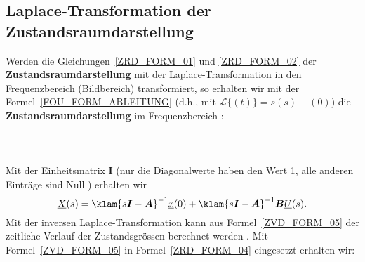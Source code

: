 \subsection{Laplace-Transformation der Zustandsraumdarstellung}
Werden die Gleichungen~\ref{ZRD_FORM_01} und \ref{ZRD_FORM_02} der
{\bf Zustandsraumdarstellung} mit der
Laplace-Transformation in den
Frequenzbereich (Bildbereich) transformiert, so erhalten wir mit der
Formel~\ref{FOU_FORM_ABLEITUNG} (d.h., mit
$\mathcal{L\{}$$(t)\}=s$$(s)-$$(0)$)
die {\bf Zustandsraumdarstellung} im Frequenzbereich \cite{GIR:RAB:STE:05}:\\~\\
\\~\\
Mit der Einheitsmatrix $\boldsymbol{I}$ (nur die Diagonalwerte haben den Wert 1, alle anderen Eintr\"age sind Null \cite{BRO:SEM:91}) erhalten wir\\
\begin{equation}
\underline{X}(s)=\klam{s\boldsymbol{I}-\boldsymbol{A}}^{-1}\underline{x}(0)+\klam{s\boldsymbol{I}-\boldsymbol{A}}^{-1}\boldsymbol{B}\underline{U}(s).\label{ZVD_FORM_05}
\end{equation}
Mit der inversen Laplace-Transformation kann aus Formel~\ref{ZVD_FORM_05} der zeitliche Verlauf der Zustandsgr\"ossen berechnet werden \cite{GIR:RAB:STE:05}. Mit Formel~\ref{ZVD_FORM_05} in Formel~\ref{ZRD_FORM_04} eingesetzt erhalten wir:\\~\\
\\~\\
